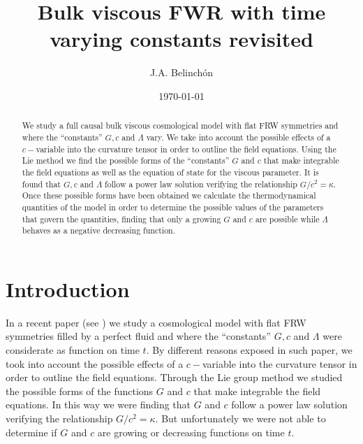 \documentclass{revtex4}
\begin{document}
\title{Bulk viscous FWR with time varying constants revisited}
\author{J.A. Belinch\'{o}n}
\date{\today}


\begin{abstract}
We study a full causal bulk viscous cosmological model with flat FRW
symmetries and where the ``constants'' $G,c$ and $\Lambda $ vary. We take
into account the possible effects of a $c-$variable into the curvature
tensor in order to outline the field equations. Using the Lie method we find
the possible forms of the ``constants'' $G$ and $c$ that make integrable the
field equations as well as the equation of state for the viscous parameter.
It is found that $G,c$ and $\Lambda $ follow a power law solution verifying
the relationship $G/c^{2}=\kappa .$ Once these possible forms have been
obtained we calculate the thermodynamical quantities of the model in order
to determine the possible values of the parameters that govern the
quantities, finding that only a growing $G$ and $c$ are possible while $%
\Lambda $ behaves as a negative decreasing function.
\end{abstract}

\maketitle

\section{Introduction}

In a recent paper (see \cite{Tony1}) we study a cosmological model with flat
FRW symmetries filled by a perfect fluid and where the ``constants'' $G,c$
and $\Lambda $ were considerate as function on time $t$. By different
reasons exposed in such paper, we took into account the possible effects of
a $c-$variable into the curvature tensor in order to outline the field
equations. Through the Lie group method we studied the possible forms of the
functions $G$ and $c$ that make integrable the field equations. In this way
we were finding that $G$ and $c$ follow a power law solution verifying the
relationship $G/c^{2}=\kappa .$ But unfortunately we were not able to
determine if $G$ and $c$ are growing or decreasing functions on time $t.$
\end{document}
